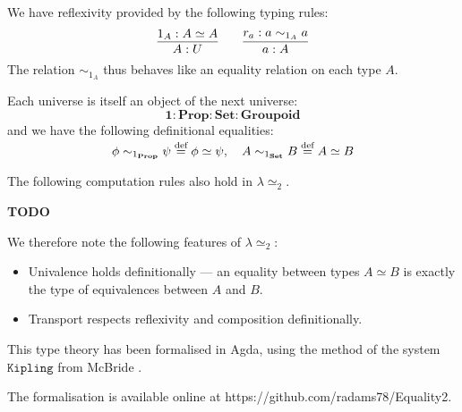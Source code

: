 \documentclass{easychair}
\newcommand{\Prop}{\ensuremath{\mathbf{Prop}}}
\newcommand{\Set}{\ensuremath{\mathbf{Set}}}
\newcommand{\Groupoid}{\ensuremath{\mathbf{Groupoid}}}
\newcommand{\LEtwo}{\ensuremath{\lambda \simeq_2}}
\newcommand{\eqdef}{\mathrel{\smash{\stackrel{\text{def}}{=}}}}
\begin{document}
We have reflexivity provided by the following typing rules:
\[ \infer{A : U}{1_A : A \simeq A} \qquad \infer{a : A}{r_a : a \sim_{1_A} a} \]
The relation $\sim_{1_A}$ thus behaves like an equality relation on each type $A$.

Each universe is itself an object of the next universe:
\[ \mathbf{1} : \Prop : \Set : \Groupoid \]
and we have the following definitional equalities:
\[ \phi \sim_{1_\Prop} \psi \eqdef \phi \simeq \psi, \quad
A \sim_{1_\Set} B \eqdef A \simeq B \]

The following computation rules also hold in $\LEtwo$.

\textbf{TODO}

We therefore note the following features of $\LEtwo$:
\begin{itemize}
\item
Univalence holds definitionally --- an equality between types $A \simeq B$ is exactly the type of equivalences between $A$ and $B$.
\item
Transport respects reflexivity and composition definitionally.
\end{itemize}

This type theory has been formalised in Agda, using the method of the system $\mathtt{Kipling}$ from McBride \cite{McBridea}.

The formalisation is available online at https://github.com/radams78/Equality2.


\end{document}
